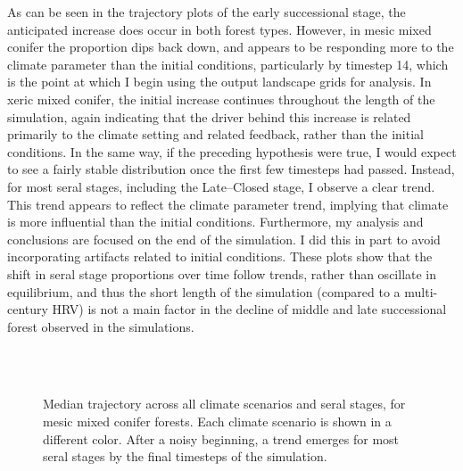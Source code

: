 As can be seen in the trajectory plots of the early successional stage, the anticipated increase does occur in both forest types. However, in mesic mixed conifer the proportion dips back down, and appears to be responding more to the climate parameter than the initial conditions, particularly by timestep 14, which is the point at which I begin using the output landscape grids for analysis. In xeric mixed conifer, the initial increase continues throughout the length of the simulation, again indicating that the driver behind this increase is related primarily to the climate setting and related feedback, rather than the initial conditions. In the same way, if the preceding hypothesis were true, I would expect to see a fairly stable distribution once the first few timesteps had passed. Instead, for most seral stages, including the Late--Closed stage, I observe a clear trend. This trend appears to reflect the climate parameter trend, implying that climate is more influential than the initial conditions. Furthermore, my analysis and conclusions are focused on the end of the simulation. I did this in part to avoid incorporating artifacts related to initial conditions. These plots show that the shift in seral stage proportions over time follow trends, rather than oscillate in equilibrium, and thus the short length of the simulation (compared to a multi-century HRV) is not a main factor in the decline of middle and late successional forest observed in the simulations.

\begin{figure}[htbp]
 \captionsetup[subfigure]{labelformat=empty}
  \centering
  \\%
   \\
    \caption{Median trajectory across all climate scenarios and seral stages, for mesic mixed conifer forests. Each climate scenario is shown in a different color. After a noisy beginning, a trend emerges for most seral stages by the final timesteps of the simulation.}
  \label{fig:median_trajectory_smcm}
\end{figure} 

